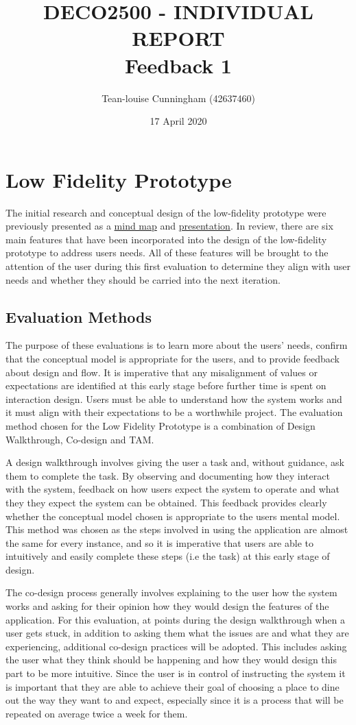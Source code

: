 \documentclass[a4 paper, 12pt]{article}
\title{DECO2500 - INDIVIDUAL REPORT \\ Feedback 1}
\author{Tean-louise Cunningham (42637460)}
\date{17 April 2020}
\begin{document}
\section{Low Fidelity Prototype}
The initial research and conceptual design of the low-fidelity prototype were previously presented as a \href{run:./MindMap.pdf}{mind map} and \href{https://youtu.be/BRX7kF7ynSQ}{presentation}. In review, there are six main features that have been incorporated into the design of the low-fidelity prototype to address users needs. All of these features will be brought to the attention of the user during this first evaluation to determine they align with user needs and whether they should be carried into the next iteration.

\subsection{Evaluation Methods}
The purpose of these evaluations is to learn more about the users' needs, confirm that the conceptual model is appropriate for the users, and to provide feedback about design and flow. It is imperative that any misalignment of values or expectations are identified at this early stage before further time is spent on interaction design. Users must be able to understand how the system works and it must align with their expectations to be a worthwhile project. The evaluation method chosen for the Low Fidelity Prototype is a combination of Design Walkthrough, Co-design and TAM.

A design walkthrough involves giving the user a task and, without guidance, ask them to complete the task. By observing and documenting how they interact with the system, feedback on how users expect the system to operate and what they they expect the system can be obtained. This feedback provides clearly whether the conceptual model chosen is appropriate to the users mental model. This method was chosen as the steps involved in using the application are almost the same for every instance, and so it is imperative that users are able to intuitively and easily complete these steps (i.e the task) at this early stage of design.

The co-design process generally involves explaining to the user how the system works and asking for their opinion how they would design the features of the application. For this evaluation, at points during the design walkthrough when a user gets stuck, in addition to asking them what the issues are and what they are experiencing, additional co-design practices will be adopted. This includes asking the user what they think should be happening and how they would design this part to be more intuitive. Since the user is in control of instructing the system it is important that they are able to achieve their goal of choosing a place to dine out the way they want to and expect, especially since it is a process that will be repeated on average twice a week for them. 
\end{document}
